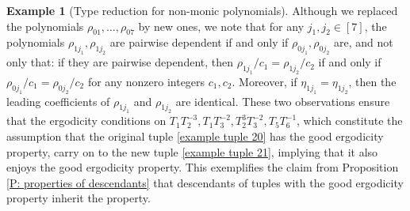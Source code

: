 \documentclass[11pt]{amsart}
\theoremstyle{definition}
\newtheorem{example}{Example}
\newcommand{\inv}{^{-1}}
\begin{document}
\begin{example}[Type reduction for non-monic polynomials]
Although we replaced the polynomials $\rho_{01}, \ldots, \rho_{07}$ by new ones, we note that for any $j_1, j_2\in[7]$, the polynomials $\rho_{1j_1}, \rho_{1j_2}$ are pairwise dependent if and only if $\rho_{0j_1}, \rho_{0j_2}$ are, and not only that: if they are pairwise dependent, then $\rho_{1j_1}/c_1 = \rho_{1j_2}/c_2$ if and only if $\rho_{0j_1}/c_1 = \rho_{0j_2}/c_2$ for  any nonzero integers $c_1, c_2$. Moreover, if $\eta_{1j_1} = \eta_{1j_2}$, then the leading coefficients of $\rho_{1j_1}$ and $\rho_{1j_2}$ are identical. These two observations ensure that the ergodicity conditions on $T_1 T_2^{-3}, T_1 T_3^{-2}, T_2^3 T_3^{-2}, T_5 T_6\inv$, which constitute the assumption that the original tuple \eqref{example tuple 20} has the good ergodicity property, carry on to the new tuple \eqref{example tuple 21}, implying that it also enjoys the good ergodicity property. This exemplifies the claim from Proposition \ref{P: properties of descendants} that descendants of tuples with the good ergodicity property inherit the property.


\end{example}
\end{document}
